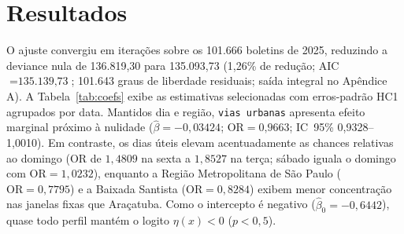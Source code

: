 \documentclass[
  article,
  12pt,
  oneside,
  a4paper,
  section=TITLE,
  english,
  brazil
]{abntex2}\usepackage[]{graphicx}\usepackage[]{xcolor}
\begin{document}
\section{Resultados}

O ajuste convergiu em  iterações sobre os 101.666 boletins de 2025, reduzindo a deviance nula de 136.819,30 para 135.093,73 (1,26\% de redução; AIC $= \text{135.139,73}$; 101.643 graus de liberdade residuais; saída integral no Apêndice A). A Tabela~\ref{tab:coefs} exibe as estimativas selecionadas com erros-padrão HC1 agrupados por data. Mantidos dia e região, \texttt{vias urbanas} apresenta efeito marginal próximo à nulidade ($\hat{\beta} = \text{$-0,03424$}$; $\mathrm{OR} = \text{0,9663}$; IC~95\% 0,9328--1,0010). Em contraste, os dias úteis elevam acentuadamente as chances relativas ao domingo ($\mathrm{OR}$ de $1{,}4809$ na sexta a $1{,}8527$ na terça; sábado iguala o domingo com $\mathrm{OR} = 1{,}0232$), enquanto a Região Metropolitana de São Paulo ($\mathrm{OR} = 0{,}7795$) e a Baixada Santista ($\mathrm{OR} = 0{,}8284$) exibem menor concentração nas janelas fixas que Araçatuba. Como o intercepto é negativo ($\hat{\beta}_0 = -0{,}6442$), quase todo perfil mantém o logito $\eta(x) < 0$ ($p < 0{,}5$).
\end{document}
